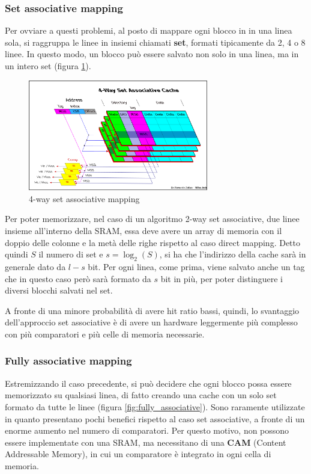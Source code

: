 \documentclass[11pt,4paper]{report}
\begin{document}
\subsubsection{Set associative mapping}
Per ovviare a questi problemi, al posto di mappare ogni blocco in in una linea sola, si raggruppa le linee in insiemi chiamati \textbf{set}, formati tipicamente da 2, 4 o 8 linee. In questo modo, un blocco può essere salvato non solo in una linea, ma in un intero set (figura \ref{fig:set_associative}).

\begin{figure}[hbtp]
	\centering
	\includegraphics[width=0.7\textwidth]{mem_sys/set_associative}
	\caption{4-way set associative mapping}
	\label{fig:set_associative}
\end{figure}

Per poter memorizzare, nel caso di un algoritmo 2-way set associative, due linee insieme all'interno della SRAM, essa deve avere un array di memoria con il doppio delle colonne e la metà delle righe rispetto al caso direct mapping. Detto quindi $S$ il numero di set e $s=\log_2(S)$, si ha che l'indirizzo della cache sarà in generale dato da $l-s$ bit. Per ogni linea, come prima, viene salvato anche un tag che in questo caso però sarà formato da $s$ bit in più, per poter distinguere i diversi blocchi salvati nel set.

A fronte di una minore probabilità di avere hit ratio bassi, quindi, lo svantaggio dell'approccio set associative è di avere un hardware leggermente più complesso con più comparatori e più celle di memoria necessarie.

\subsubsection{Fully associative mapping}
Estremizzando il caso precedente, si può decidere che ogni blocco possa essere memorizzato su qualsiasi linea, di fatto creando una cache con un solo set formato da tutte le linee (figura \ref{fig:fully_associative}). Sono raramente utilizzate in quanto presentano pochi benefici rispetto al caso set associative, a fronte di un enorme aumento nel numero di comparatori. Per questo motivo, non possono essere implementate con una SRAM, ma necessitano di una \textbf{CAM} (Content Addressable Memory), in cui un comparatore è integrato in ogni cella di memoria.
\end{document}
